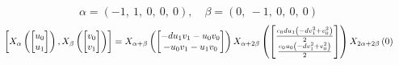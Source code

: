 \documentclass[11pt]{article}
\theoremstyle{definition}
\begin{document}
\[
\alpha = \left( -1, \  1, \  0, \  0, \  0\right), \quad \beta = \left( 0, \  -1, \  0, \  0, \  0\right)
\]
\[
\scaletoalign{\textwidth}{\left[ X_{\alpha}\left(\left[\begin{matrix}u_{0}\\u_{1}\end{matrix}\right]\right), X_{\beta}\left(\left[\begin{matrix}v_{0}\\v_{1}\end{matrix}\right]\right) \right] = X_{\alpha + \beta}\left(\left[\begin{matrix}- d u_{1} v_{1} - u_{0} v_{0}\\- u_{0} v_{1} - u_{1} v_{0}\end{matrix}\right]\right) X_{\alpha + 2\beta}\left(\left[\begin{matrix}\frac{c_{0} d u_{1} \left(- d v_{1}^{2} + v_{0}^{2}\right)}{2}\\\frac{c_{0} u_{0} \left(- d v_{1}^{2} + v_{0}^{2}\right)}{2}\end{matrix}\right]\right) X_{2\alpha + 2\beta}\left(0\right)}
\]
\end{document}
